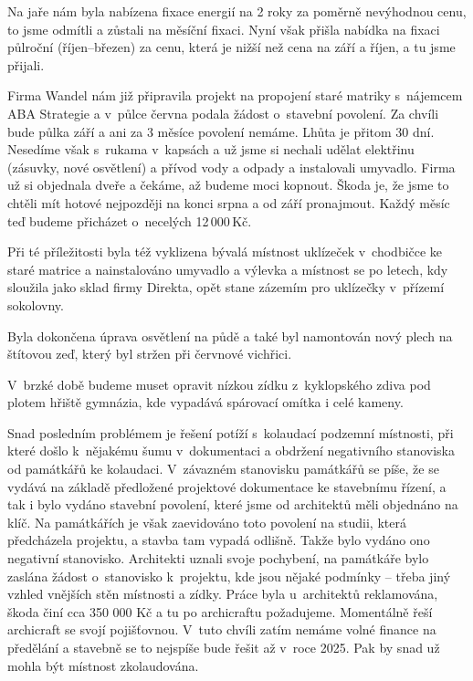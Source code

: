 \documentclass[11pt]{article}
\begin{document}
Na jaře nám byla nabízena fixace energií na 2 roky za poměrně nevýhodnou cenu, to jsme odmítli a zůstali na měsíční fixaci. Nyní však přišla nabídka na fixaci půlroční (říjen–březen) za cenu, která je nižší než cena na září a říjen, a tu jsme přijali.

Firma Wandel nám již připravila projekt na propojení staré matriky s~nájemcem ABA Strategie a v~půlce června podala žádost o~stavební povolení. Za chvíli bude půlka září a ani za 3 měsíce povolení nemáme. Lhůta je přitom 30 dní. Nesedíme však s~rukama v~kapsách a už jsme si nechali udělat elektřinu (zásuvky, nové osvětlení) a přívod vody a odpady a instalovali umyvadlo. Firma už si objednala dveře a čekáme, až budeme moci kopnout. Škoda je, že jsme to chtěli mít hotové nejpozději na konci srpna a od září pronajmout. Každý měsíc teď budeme přicházet o~necelých 12\,000\,Kč.

Při té příležitosti byla též vyklizena bývalá místnost uklízeček v~chodbičce ke staré matrice a nainstalováno umyvadlo a výlevka a místnost se po letech, kdy sloužila jako sklad firmy Direkta, opět stane zázemím pro uklízečky v~přízemí sokolovny.

Byla dokončena úprava osvětlení na půdě a také byl namontován nový plech na štítovou zeď, který byl stržen při červnové vichřici.

V~brzké době budeme muset opravit nízkou zídku z~kyklopského zdiva pod plotem hřiště gymnázia, kde vypadává spárovací omítka i celé kameny.

Snad posledním problémem je řešení potíží s~kolaudací podzemní místnosti, při které došlo k~nějakému šumu v~dokumentaci a obdržení negativního stanoviska od památkářů ke kolaudaci. V~závazném stanovisku památkářů se píše, že se vydává na základě předložené projektové dokumentace ke stavebnímu řízení, a tak i bylo vydáno stavební povolení, které jsme od architektů měli objednáno na klíč. Na památkářích je však zaevidováno toto povolení na studii, která předcházela projektu, a stavba tam vypadá odlišně. Takže bylo vydáno ono negativní stanovisko. Architekti uznali svoje pochybení, na památkáře bylo zaslána žádost o~stanovisko k~projektu, kde jsou nějaké podmínky – třeba jiný vzhled vnějších stěn místnosti a zídky. Práce byla u~architektů reklamována, škoda činí cca 350 000 Kč a tu po archicraftu požadujeme. Momentálně řeší archicraft se svojí pojišťovnou. V~tuto chvíli zatím nemáme volné finance na předělání a stavebně se to nejspíše bude řešit až v~roce 2025. Pak by snad už mohla být místnost zkolaudována.
\end{document}
